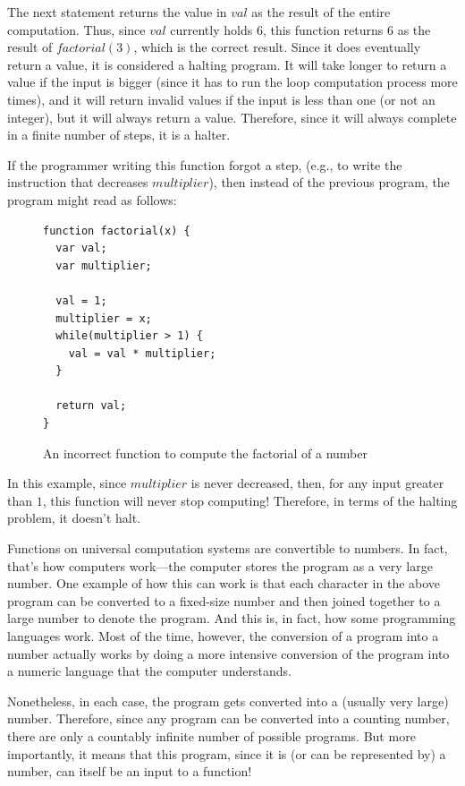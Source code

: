 The next statement returns the value in $val$ as the result of the entire computation.  Thus, since $val$ currently holds $6$, this function returns $6$ as the result of $factorial(3)$, which is the correct result.  Since it does eventually return a value, it is considered a halting program.  It will take longer to return a value if the input is bigger (since it has to run the loop computation process more times), and it will return invalid values if the input is less than one (or not an integer), but it will always return a value.  Therefore, since it will always complete in a finite number of steps, it is a halter.

If the programmer writing this function forgot a step, (e.g., to write the instruction that decreases $multiplier$), then instead of the previous program, the program might read as follows:

\begin{figure}[H]
\begin{mdframed}
\begin{verbatim}
function factorial(x) {
  var val;
  var multiplier;

  val = 1;
  multiplier = x;
  while(multiplier > 1) {
    val = val * multiplier;
  }

  return val;
}
\end{verbatim}
\end{mdframed}
\caption{An incorrect function to compute the factorial of a number}
\end{figure}

In this example, since $multiplier$ is never decreased, then, for any input greater than $1$, this function will never stop computing!  Therefore, in terms of the halting problem, it doesn't halt.

Functions on universal computation systems are convertible to numbers.  In fact, that's how computers work---the computer stores the program as a very large number.  One example of how this can work is that each character in the above program can be converted to a fixed-size number and then joined together to a large number to denote the program.  And this is, in fact, how some programming languages work.  Most of the time, however, the conversion of a program into a number actually works by doing a more intensive conversion of the program into a numeric language that the computer understands.  

Nonetheless, in each case, the program gets converted into a (usually very large) number.  Therefore, since any program can be converted into a counting number, there are only a countably infinite number of possible programs.  But more importantly, it means that this program, since it is (or can be represented by) a number, can itself be an input to a function!

